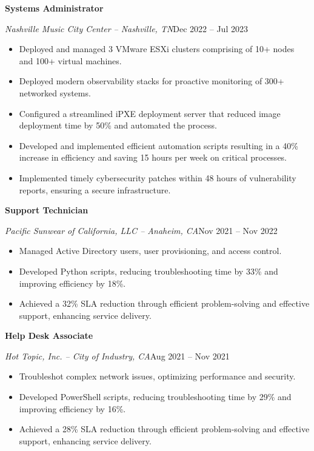 \documentclass[a4paper]{article}
\begin{document}
\begin{minipage}[t]{0.62\textwidth}
    \vspace{0.5em}
    \textbf{Systems Administrator}\par
    \textit{Nashville Music City Center -- Nashville, TN}\hfill Dec 2022 -- Jul 2023

    \begin{itemize}[noitemsep,nolistsep]
        \item Deployed and managed 3 VMware ESXi clusters comprising of 10+ nodes and 100+ virtual machines.
        \item Deployed modern observability stacks for proactive monitoring of 300+ networked systems.
        \item Configured a streamlined iPXE deployment server that reduced image deployment time by 50\% and automated the process.
        \item Developed and implemented efficient automation scripts resulting in a 40\% increase in efficiency and saving 15 hours per week on critical processes.
        \item Implemented timely cybersecurity patches within 48 hours of vulnerability reports, ensuring a secure infrastructure.
    \end{itemize}

    \vspace{0.5em}
    \textbf{Support Technician}\par
    \textit{Pacific Sunwear of California, LLC -- Anaheim, CA}\hfill Nov 2021 -- Nov 2022

    \begin{itemize}[noitemsep,nolistsep]
        \item Managed Active Directory users, user provisioning, and access control.
        \item Developed Python scripts, reducing troubleshooting time by 33\% and improving efficiency by 18\%.
        \item Achieved a 32\% SLA reduction through efficient problem-solving and effective support, enhancing service delivery.
    \end{itemize}

    \vspace{0.5em}
    \textbf{Help Desk Associate}\par
    \textit{Hot Topic, Inc. -- City of Industry, CA}\hfill Aug 2021 -- Nov 2021

    \begin{itemize}[noitemsep,nolistsep]
        \item Troubleshot complex network issues, optimizing performance and security.
        \item Developed PowerShell scripts, reducing troubleshooting time by 29\% and improving efficiency by 16\%.
        \item Achieved a 28\% SLA reduction through efficient problem-solving and effective support, enhancing service delivery.
    \end{itemize}


\end{minipage}
\end{document}
